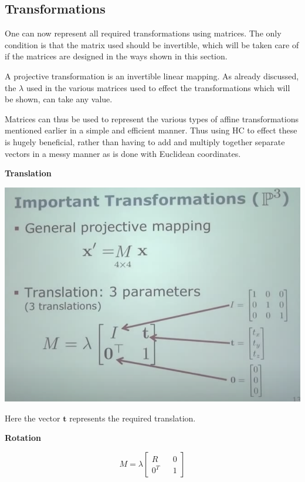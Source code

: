 \documentclass[a4paper]{article}
\begin{document}
\subsection{Transformations}

One can now represent all required transformations using matrices. The only condition is that the matrix used should be invertible, which will be taken care of if the matrices are designed in the ways shown in this section.

A projective transformation is an invertible linear mapping. As already discussed, the $\lambda$ used in the various matrices used to effect the transformations which will be shown, can take any value. 

Matrices can thus be used to represent the various types of affine transformations mentioned earlier in a simple and efficient manner. Thus using HC to effect these is hugely beneficial, rather than having to add and multiply together separate vectors in a messy manner as is done with Euclidean coordinates.

\textbf{Translation}

\begin{center}
\includegraphics[scale=0.5]{3dtran}
\end{center}

Here the vector $\mathbf{t}$ represents the required translation.

\textbf{Rotation}

\begin{equation*}
M = \lambda
\begin{bmatrix}
R && 0 \\ 0^T && 1
\end{bmatrix}
\end{equation*}
\end{document}
